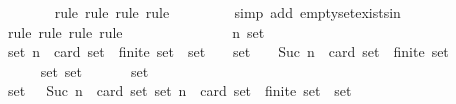 \begin{isabellebody}
\ \ \ \ \ \ \isamarkupfalse%
\ {\isacharparenleft}rule{\isacharcomma}\ rule{\isacharcomma}\ rule{\isacharcomma}\ rule{\isacharparenright}\isanewline
\ \ \ \ \ \ \ \isamarkupfalse%
\ {\isacharparenleft}simp\ add{\isacharcolon}\ empty{\isacharunderscore}set{\isacharunderscore}exists{\isacharunderscore}in{\isacharunderscore}{\isasymSigma}{\isacharparenright}\isanewline
\ \ \ \ \ \ \isamarkupfalse%
\ {\isacharparenleft}rule{\isacharcomma}\ rule{\isacharcomma}\ rule{\isacharcomma}\ rule{\isacharparenright}\isanewline
\ \ \ \ \isamarkupfalse%
\ {\isacharminus}\ \isanewline
\ \ \ \ \ \ \isamarkupfalse%
\ n\ {\isasymsigma}{\isacharunderscore}set\isanewline
\ \ \ \ \ \ \isamarkupfalse%
\ {\isachardoublequoteopen}{\isasymforall}{\isasymsigma}{\isacharunderscore}set{\isasymsubseteq}{\isasymSigma}{\isachardot}\ n\ {\isacharequal}\ card\ {\isasymsigma}{\isacharunderscore}set\ {\isasymlongrightarrow}\ finite\ {\isasymsigma}{\isacharunderscore}set\ {\isasymlongrightarrow}\ {\isasymUnion}{\isasymsigma}{\isacharunderscore}set\ {\isasymin}\ {\isasymSigma}{\isachardoublequoteclose}\ \ {\isachardoublequoteopen}{\isasymsigma}{\isacharunderscore}set\ {\isasymsubseteq}\ {\isasymSigma}{\isachardoublequoteclose}\ \ {\isachardoublequoteopen}Suc\ n\ {\isacharequal}\ card\ {\isasymsigma}{\isacharunderscore}set{\isachardoublequoteclose}\ \ {\isachardoublequoteopen}finite\ {\isasymsigma}{\isacharunderscore}set{\isachardoublequoteclose}\ \isanewline
\ \ \ \ \ \ \isamarkupfalse%
\ \isamarkupfalse%
\ {\isachardoublequoteopen}{\isasymforall}\ {\isasymsigma}\ {\isasymin}\ {\isasymsigma}{\isacharunderscore}set{\isachardot}\ {\isasymsigma}{\isacharunderscore}set\ {\isacharminus}\ {\isacharbraceleft}{\isasymsigma}{\isacharbraceright}\ {\isasymsubseteq}\ {\isasymSigma}\ {\isasymand}\ {\isasymUnion}\ {\isacharparenleft}{\isasymsigma}{\isacharunderscore}set\ {\isacharminus}\ {\isacharbraceleft}{\isasymsigma}{\isacharbraceright}{\isacharparenright}\ {\isasymin}\ {\isasymSigma}{\isachardoublequoteclose}\isanewline
\ \ \ \ \ \ \ \ \isamarkupfalse%
\ {\isacartoucheopen}{\isasymsigma}{\isacharunderscore}set\ {\isasymsubseteq}\ {\isasymSigma}{\isacartoucheclose}\ {\isacartoucheopen}Suc\ n\ {\isacharequal}\ card\ {\isasymsigma}{\isacharunderscore}set{\isacartoucheclose}\ {\isacartoucheopen}{\isasymforall}{\isasymsigma}{\isacharunderscore}set{\isasymsubseteq}{\isasymSigma}{\isachardot}\ n\ {\isacharequal}\ card\ {\isasymsigma}{\isacharunderscore}set\ {\isasymlongrightarrow}\ finite\ {\isasymsigma}{\isacharunderscore}set\ {\isasymlongrightarrow}\ {\isasymUnion}{\isasymsigma}{\isacharunderscore}set\ {\isasymin}\ {\isasymSigma}{\isacartoucheclose}\isanewline

\end{isabellebody}

